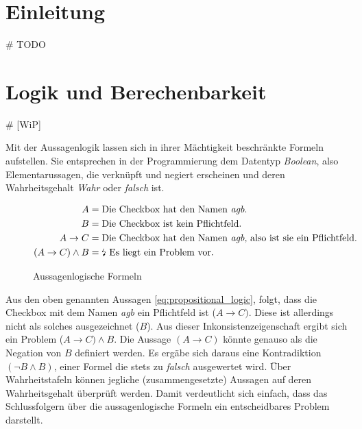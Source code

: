 \documentclass[runningheads,a4paper]{llncs}
\begin{document}
\section{Einleitung}
\# TODO
\newpage
\section{Logik und Berechenbarkeit}

\# [WiP]

Mit der Aussagenlogik lassen sich in ihrer Mächtigkeit beschränkte Formeln aufstellen. Sie entsprechen in der Programmierung dem Datentyp \textit{Boolean}, also Elementarussagen, die verknüpft und negiert erscheinen und deren Wahrheitsgehalt \textit{Wahr} oder \textit{falsch} ist.

\begin{figure}
\begin{align}
\begin{split}
A &= \textnormal{Die Checkbox hat den Namen \textit{agb}.}\\
B &= \textnormal{Die Checkbox ist kein Pflichtfeld.}\\
A \to C &= \textnormal{Die Checkbox hat den Namen \textit{agb}, also ist sie ein Pflichtfeld.}\\
(A \to C) \land B &= \textnormal{\lightning\ Es liegt ein Problem vor.}
\label{eq:propositional_logic}
\end{split}
\end{align}
\caption{Aussagenlogische Formeln}
\end{figure}
 
Aus den oben genannten Aussagen \eqref{eq:propositional_logic}, folgt, dass die Checkbox mit dem Namen \textit{agb} ein Pflichtfeld ist (\(A \to C)\). 
Diese ist allerdings nicht als solches ausgezeichnet (\(B\)). 
Aus dieser Inkonsistenzeigenschaft ergibt sich ein Problem (\(A \to C) \land B\). 
Die Aussage \((A \to C)\) könnte genauso als die Negation von \(B\) definiert werden. 
Es ergäbe sich daraus eine Kontradiktion \((\neg B \land B)\), einer Formel die stets zu \textit{falsch} ausgewertet wird. 
Über Wahrheitstafeln können jegliche (zusammengesetzte) Aussagen auf deren Wahrheitsgehalt überprüft werden. 
Damit verdeutlicht sich einfach, dass das Schlussfolgern über die aussagenlogische Formeln ein entscheidbares Problem darstellt.
\\
\end{document}
